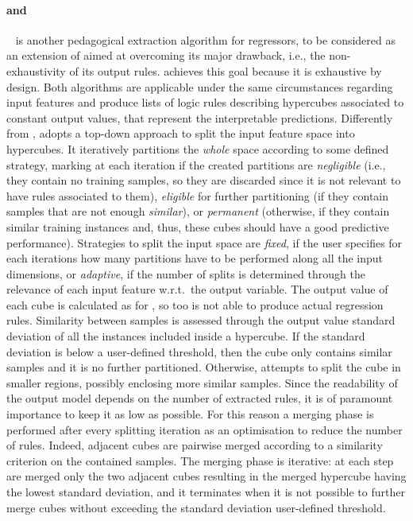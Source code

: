 \documentclass[
]{ceurart}
\begin{document}
\paragraph{\gridex{} and \gridrex{}}\label{par:gridex}

\gridex~\cite{gridex-extraamas2021} is another pedagogical extraction algorithm for regressors, to be considered as an extension of \iter{} aimed at overcoming its major drawback, i.e., the non-exhaustivity of its output rules.
%
\gridex{} achieves this goal because it is exhaustive by design.
%
Both algorithms are applicable under the same circumstances regarding input features and produce lists of logic rules describing hypercubes associated to constant output values, that represent the interpretable predictions.
%
Differently from \iter{}, \gridex{} adopts a top-down approach to split the input feature space into hypercubes.
%
It iteratively partitions the \emph{whole} space according to some defined strategy, marking at each iteration if the created partitions are \emph{negligible} (i.e., they contain no training samples, so they are discarded since it is not relevant to have rules associated to them), \emph{eligible} for further partitioning (if they contain samples that are not enough \emph{similar}), or \emph{permanent} (otherwise, if they contain similar training instances and, thus, these cubes should have a good predictive performance).
%
Strategies to split the input space are \emph{fixed}, if the user specifies for each iterations how many partitions have to be performed along all the input dimensions, or \emph{adaptive}, if the number of splits is determined through the relevance of each input feature w.r.t.\ the output variable.
%
The output value of each cube is calculated as for \iter{}, so \gridex{} too is not able to produce actual regression rules.
%
Similarity between samples is assessed through the output value standard deviation of all the instances included inside a hypercube.
%
If the standard deviation is below a user-defined threshold, then the cube only contains similar samples and it is no further partitioned.
%
Otherwise, \gridex{} attempts to split the cube in smaller regions, possibly enclosing more similar samples.
%
Since the readability of the output model depends on the number of extracted rules, it is of paramount importance to keep it as low as possible.
%
For this reason a merging phase is performed after every splitting iteration as an optimisation to reduce the number of rules.
%
Indeed, adjacent cubes are pairwise merged according to a similarity criterion on the contained samples.
%
The merging phase is iterative: at each step are merged only the two adjacent cubes resulting in the merged hypercube having the lowest standard deviation, and it terminates when it is not possible to further merge cubes without exceeding the standard deviation user-defined threshold.
\end{document}
